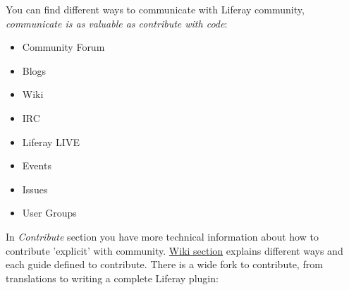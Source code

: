 \par You can find different ways to communicate with Liferay community, \textit{communicate is as valuable as contribute with code}:

\begin{itemize}
	\item Community Forum
	\item Blogs
	\item Wiki
	\item IRC
	\item Liferay LIVE
	\item Events
	\item Issues
	\item User Groups
\end{itemize}

\par In \textit{Contribute} section you have more technical information about how to contribute 'explicit' with community. \href{http://www.liferay.com/community/wiki/-/wiki/Main/Contributing}{Wiki section} explains different ways and each guide defined to contribute. There is a wide fork to contribute, from translations to writing a complete Liferay plugin:

